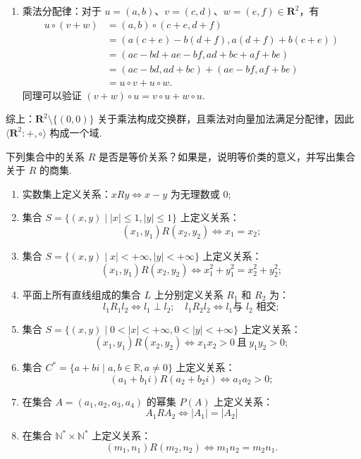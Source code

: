 \begin{exercise}
\begin{exgroup}
\begin{answer}
\begin{enumerate}
                \item 乘法分配律：对于 $u=(a,b)$、$v=(c,d)$、$w=(e,f) \in \mathbf{R}^2$，有
                      \begin{align*}
                          u \circ (v + w) & = (a,b) \circ (c+e, d+f)                                 \\
                                          & = (a(c+e) - b(d+f), a(d+f) + b(c+e))                   \\
                                          & = (ac - bd + ae - bf, ad + bc + af + be)               \\
                                          & = (ac - bd, ad + bc) + (ae - bf, af + be)             \\
                                          & = u \circ v + u \circ w.
                      \end{align*}
                      同理可以验证 $(v + w) \circ u = v \circ u + w \circ u$.
            \end{enumerate}
            综上：$\mathbf{R}^2 \setminus \{(0,0)\} $ 关于乘法构成交换群，且乘法对向量加法满足分配律，因此 $\langle\mathbf{R}^2\colon+,\circ\rangle$ 构成一个域.
        \end{answer}

        \item 下列集合中的关系 $ R $ 是否是等价关系？如果是，说明等价类的意义，并写出集合关于 $ R $ 的商集.
        \begin{enumerate}
            \item 实数集上定义关系：$ xRy \iff x - y $ 为无理数或 0;
            \item 集合 $ S = \{ (x, y) \mid |x| \leqslant 1, |y| \leqslant 1 \} $ 上定义关系：\[ (x_1, y_1) R (x_2, y_2) \iff x_1 = x_2; \]
            \item 集合 $ S = \{ (x, y) \mid x| < +\infty, |y| < +\infty \} $ 上定义关系：\[ (x_1, y_1) R (x_2, y_2) \iff x_1^2 + y_1^2 = x_2^2 + y_2^2; \]
            \item 平面上所有直线组成的集合 $ L $ 上分别定义关系 $ R_1 $ 和 $ R_2 $ 为：\[ l_1 R_1 l_2 \iff l_1 \perp l_2; \quad l_1 R_2 l_2 \iff l_1 \text{与 $l_2$ 相交};\]
            \item 集合 $ S = \{ (x, y) \mid 0 < |x| < +\infty, 0 < |y| < +\infty \} $ 上定义关系：\[ (x_1, y_1) R (x_2, y_2) \iff x_1 x_2 > 0 \ \text{且} \ y_1 y_2 > 0; \]
            \item 集合 $ C^* = \{ a + bi \mid a, b \in \mathbb{R}, a \neq 0 \} $ 上定义关系：\[ (a_1 + b_1 i) R (a_2 + b_2 i) \iff a_1 a_2 > 0; \]
            \item 在集合 $ A = (a_1, a_2, a_3, a_4) $ 的幂集 $ P(A) $ 上定义关系：\[ A_1 R A_2 \iff |A_1| = |A_2| \]
            \item 在集合 $ \mathbb{N}^* \times \mathbb{N}^* $ 上定义关系：\[ (m_1, n_1) R (m_2, n_2) \iff m_1 n_2 = m_2 n_1.\]
        \end{enumerate}


\end{exgroup}
\end{exercise}
